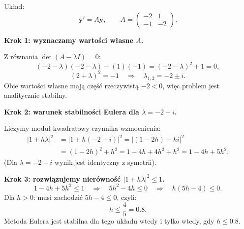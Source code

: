 \documentclass[a4paper,12pt]{article}
\begin{document}
Układ:
\[
\mathbf{y}' = A\mathbf{y}, \qquad
A = \begin{pmatrix} -2 & 1 \\ -1 & -2 \end{pmatrix}.
\]

\textbf{Krok 1: wyznaczamy wartości własne $A$.}

Z równania $\det(A-\lambda I)=0$:
\[
(-2-\lambda)(-2-\lambda) - (1)(-1) = (-2-\lambda)^2 + 1 = 0,
\]
\[
(2+\lambda)^2 = -1 \quad\Rightarrow\quad \lambda_{1,2} = -2 \pm i.
\]
Obie wartości własne mają część rzeczywistą $-2 < 0$, więc problem jest analitycznie stabilny.

\textbf{Krok 2: warunek stabilności Eulera dla $\lambda = -2+i$.}

Liczymy moduł kwadratowy czynnika wzmocnienia:
\begin{align*}
|1 + h\lambda|^2 &= |1 + h(-2+i)|^2 = |(1-2h) + hi|^2 \\
                  &= (1-2h)^2 + h^2 = 1 - 4h + 4h^2 + h^2 = 1 - 4h + 5h^2.
\end{align*}
(Dla $\lambda = -2-i$ wynik jest identyczny z symetrii).

\textbf{Krok 3: rozwiązujemy nierówność $|1+h\lambda|^2 \leq 1$.}
\[
1 - 4h + 5h^2 \leq 1 \quad\Rightarrow\quad 5h^2 - 4h \leq 0 \quad\Rightarrow\quad h(5h-4) \leq 0.
\]
Dla $h > 0$: musi zachodzić $5h - 4 \leq 0$, czyli:
\[
\boxed{h \leq \frac{4}{5} = 0.8.}
\]
Metoda Eulera jest stabilna dla tego układu wtedy i tylko wtedy, gdy \textbf{$h \leq 0.8$}.
\end{document}

